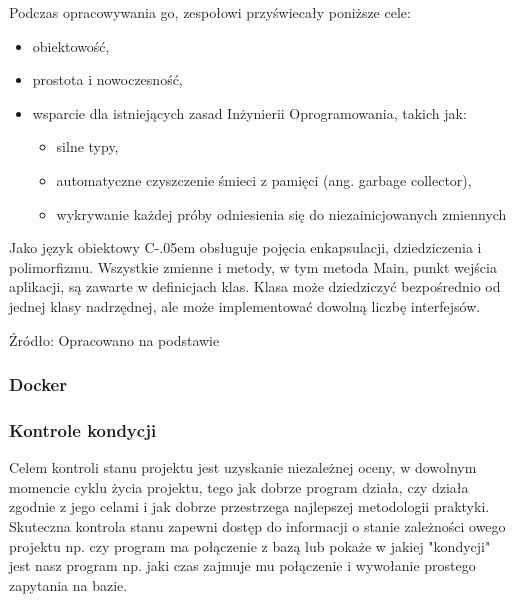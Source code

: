 \documentclass[12pt]{article}
\newcommand{\Csharp}{%
  {\settoheight{\dimen0}{C}C\kern-.05em \resizebox{!}{\dimen0}{\raisebox{\depth}{\# }}}}
\numberwithin{figure}{section}
\begin{document}
Podczas opracowywania go, zespołowi przyświecały poniższe cele:
    \begin{itemize}
        \item obiektowość,
        \item prostota i nowoczesność,
        \item wsparcie dla istniejących zasad Inżynierii Oprogramowania, takich jak:
        \begin{itemize}
            \item silne typy,
            \item automatyczne czyszczenie śmieci z pamięci (ang. garbage collector),
            \item wykrywanie każdej próby odniesienia się do niezainicjowanych zmiennych
        \end{itemize}
    \end{itemize}
    
Jako język obiektowy \Csharp obsługuje pojęcia enkapsulacji, dziedziczenia i polimorfizmu. Wszystkie zmienne i metody, w tym metoda Main, punkt wejścia aplikacji, są zawarte w definicjach klas. Klasa może dziedziczyć bezpośrednio od jednej klasy nadrzędnej, ale może implementować dowolną liczbę interfejsów.

    
Źródło: Opracowano na podstawie \cite{csharp}
    
\subsubsection{Docker}

\subsubsection{Kontrole kondycji}
Celem kontroli stanu projektu jest uzyskanie niezależnej oceny, w dowolnym momencie cyklu życia projektu, tego jak dobrze program działa, czy działa zgodnie z jego celami i jak dobrze przestrzega najlepszej metodologii praktyki. Skuteczna kontrola stanu zapewni dostęp do informacji o stanie zależności owego projektu np. czy program ma połączenie z bazą lub pokaże w jakiej "kondycji" jest nasz program np. jaki czas zajmuje mu połączenie i wywołanie prostego zapytania na bazie. 
    
\end{document}
